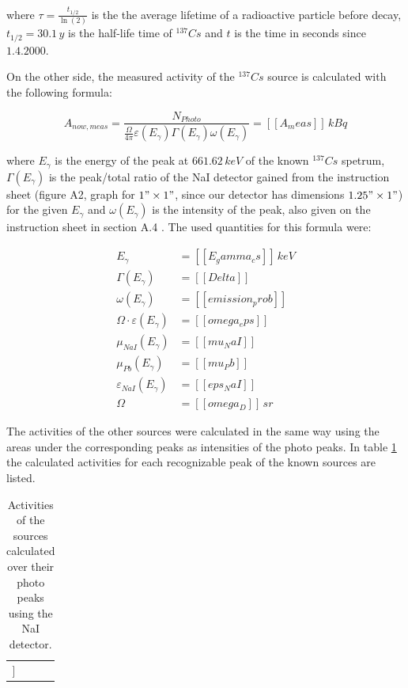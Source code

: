 \documentclass[a4paper]{article}
\begin{document}
where $\tau = \frac{t_{1/2}}{\ln{\left( 2 \right)}}$ is the the average lifetime of a radioactive particle before decay, $t_{1/2} = 30.1 \, y$ is the half-life time of $^{137}Cs$ and $t$ is the time in seconds since $1.4.2000$.

On the other side, the measured activity of the $^{137}Cs$ source is calculated with the following formula:

\begin{equation}
A_{now,meas} = \frac{N_{Photo}}{\frac{\Omega}{4 \pi} \varepsilon(E_{\gamma}) \Gamma(E_{\gamma}) \omega(E_{\gamma})} = [[A_meas]] \, kBq
\label{eq:activity_meas}
\end{equation}

where $E_{\gamma}$ is the energy of the peak at $661.62 \, keV$ of the known $^{137}Cs$ spetrum, $\Gamma(E_{\gamma})$ is the peak/total ratio of the NaI detector gained from the instruction sheet (figure A2, graph for $1" \times 1"$, since our detector has dimensions $1.25" \times 1"$) for the given $E_{\gamma}$ and $\omega(E_{\gamma})$ is the intensity of the peak, also given on the instruction sheet in section A.4 \cite{instruction_sheet}.
The used quantities for this formula were:

\begin{subequations}
\begin{align}
E_{\gamma} &= [[E_gamma_cs]] \, keV \\
\Gamma(E_{\gamma}) &= [[Delta]] \\
\omega(E_{\gamma}) &= [[emission_prob]] \\
\Omega \cdot \varepsilon(E_{\gamma}) &= [[omega_eps]] \\
\mu_{NaI}(E_{\gamma}) &= [[mu_NaI]] \\
\mu_{Pb}(E_{\gamma}) &= [[mu_Pb]] \\
\varepsilon_{NaI}(E_{\gamma}) &= [[eps_NaI]] \\
\Omega &= [[omega_D]] \, sr
\label{eq:activity_quantities}
\end{align}
\end{subequations}

The activities of the other sources were calculated in the same way using the areas under the corresponding peaks as intensities of the photo peaks. In table \ref{tab:activites} the calculated activities for each recognizable peak of the known sources are listed.

\begin{table}[H]
\centering
\caption{Activities of the sources calculated over their photo peaks using the NaI detector.}
\begin{tabular}{rr|rr}
\hline
[[table:activities]]
\end{tabular}
\label{tab:activites}
\end{table}
\end{document}

